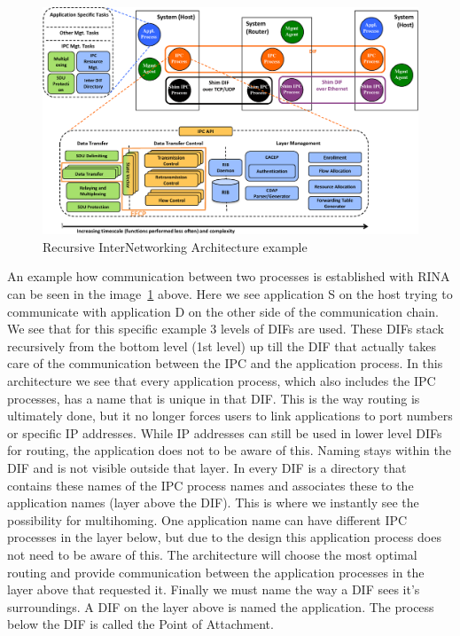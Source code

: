 \npar
\begin{figure}[H]
    \centering
    \includegraphics[width=\textwidth]{figures/referencemodel}
    \caption{Recursive InterNetworking Architecture example \citep{vrijders2014prototyping}} 
    \label{fig:RINAexample}
\end{figure}
\npar
An example how communication between two processes is established with RINA can be seen in the image~\ref{fig:RINAexample} above. Here we see application S on the host trying to communicate with application D on the other side of the communication chain. We see that for this specific example 3 levels of DIFs are used. These DIFs stack recursively from the bottom level (1st level) up till the DIF that actually takes care of the communication between the IPC and the application process. 
\npar
In this architecture we see that every application process, which also includes the IPC processes, has a name that is unique in that DIF. This is the way routing is ultimately done, but it no longer forces users to link applications to port numbers or specific IP addresses. While IP addresses can still be used in lower level DIFs for routing, the application does not to be aware of this. Naming stays within the DIF and is not visible outside that layer. In every DIF is a directory that contains these names of the IPC process names  and associates these to the application names (layer above the DIF). This is where we instantly see the possibility for multihoming. One application name can have different IPC processes in the layer below, but due to the design this application process does not need to be aware of this. The architecture will choose the most optimal routing and provide communication between the application processes in the layer above that requested it. Finally we must name the way a DIF sees it's surroundings. A DIF on the layer above is named the application. The process below the DIF is called the Point of Attachment. 


